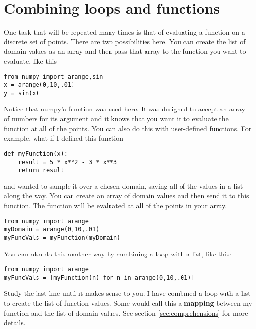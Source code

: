 \section{Combining loops and functions}
One task that will be repeated many times is that of evaluating a
function on a discrete set of points.  There are two possibilities
here. You can create the list of domain values as an array and then
pass that array to the function you want to evaluate, like this
\begin{Verbatim}
from numpy import arange,sin
x = arange(0,10,.01)
y = sin(x)
\end{Verbatim}
Notice that numpy's  function was used here.  It was
designed to accept an array of numbers for its argument and it knows
that you want it to evaluate the function at all of the points.  You
can also do this with user-defined functions. For example, what if I
defined this function
\begin{Verbatim}
def myFunction(x):
    result = 5 * x**2 - 3 * x**3
    return result
\end{Verbatim}
and wanted to sample it over a chosen domain, saving all of the
values in a list along the way.  You can create an array of domain
values and then send it to this function.  The function will be
evaluated at all of the points in your array. 
\begin{Verbatim}
from numpy import arange
myDomain = arange(0,10,.01)
myFuncVals = myFunction(myDomain)
\end{Verbatim}
You can also do this another way by combining a loop with a list, like this:
\begin{Verbatim}
from numpy import arange
myFuncVals = [myFunction(n) for n in arange(0,10,.01)]
\end{Verbatim}
Study the last line until it makes sense to you.  I have combined a
loop with a list to create the list of function values.  Some would
call this a {\bf mapping} between my function and the list of domain
values.  See section \ref{sec:comprehensions} for more details.
